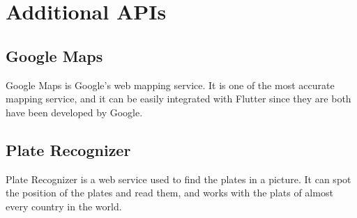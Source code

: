 \documentclass[../ITD.tex]{subfiles}
\begin{document}
    \section{Additional APIs}\label{sec:additional-apis}
    \subsection{Google Maps}\label{subsec:google-maps}
    Google Maps is Google's web mapping service.
    It is one of the most accurate mapping service, and it can be easily integrated with Flutter since they are both have been developed by Google.
    \subsection{Plate Recognizer}\label{subsec:plate-recognizer}
    Plate Recognizer is a web service used to find the plates in a picture.
    It can spot the position of the plates and read them, and works with the plats of almost every country in the world.
\end{document}
